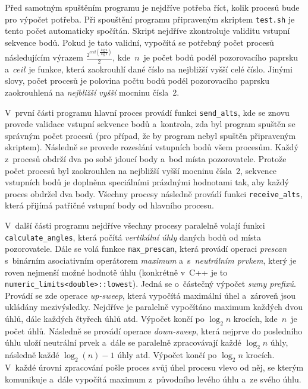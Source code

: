 \documentclass[a4paper, 10pt, twocolumn]{article}
\begin{document}
    Před samotným spuštěním programu je nejdříve potřeba říct, kolik
    procesů bude pro výpočet potřeba. Při spouštění programu připraveným
    skriptem \texttt{test.sh} je tento počet automaticky spočítán. Skript
    nejdříve zkontroluje validitu vstupní sekvence bodů. Pokud
    je tato validní, vypočítá se potřebný počet procesů následujícím
    výrazem $ \frac{2^{ceil(\frac{\log n}{\log 2})}}{2} $, kde~$ n $~je
    počet bodů podél pozorovacího paprsku a~$ ceil $ je funkce, která
    zaokrouhlí dané číslo na nejbližší vyšší celé číslo. Jinými slovy,
    počet procesů je polovina počtu bodů podél pozorovacího paprsku
    zaokrouhlená na \emph{nejbližší vyšší} mocninu čísla~2.

    V~první části programu hlavní proces provádí funkci
    \texttt{send\_alts}, kde se znovu provede validace vstupní sekvence
    bodů a~kontrola, zda byl program spuštěn se správným
    počet procesů (pro případ, že by program nebyl spuštěn připraveným
    skriptem). Následně se provede rozeslání vstupních bodů všem
    procesům. Každý z~procesů obdrží dva po sobě jdoucí body a~bod místa
    pozorovatele. Protože počet procesů byl zaokrouhlen na nejbližší
    vyšší mocninu čísla~2, sekvence vstupních bodů je doplněna speciálními
    prázdnými hodnotami tak, aby každý proces obdržel dva body. Všechny
    procesy následně provádí funkci \texttt{receive\_alts}, která přijímá
    patřičné vstupní body od hlavního procesu.

    V~další části programu nejdříve všechny procesy paralelně volají funkci
    \texttt{calculate\_angles}, která počítá \emph{vertikální úhly} daných
    bodů od místa pozorovatele. Dále se volá funkce \texttt{max\_prescan},
    která provádí operaci \emph{prescan} s~binárním asociativním operátorem
    \emph{maximum} a~s~\emph{neutrálním prvkem}, který je roven nejmenší
    možné hodnotě úhlu (konkrétně v~C++ je to
    \texttt{numeric\_limits<double>::lowest}). Jedná se o~částečný výpočet
    \emph{sumy prefixů}. Provádí se zde operace \emph{up-sweep},
    která vypočítá maximální úhel a~zároveň jsou ukládány mezivýsledky.
    Nejdříve je paralelně vypočítáno maximum každých dvou úhlů, dále
    každých čtyřech úhlů atd. Výpočet končí po $ \log_2 n $ krocích,
    kde~$ n $~je počet úhlů. Následně se provádí operace \emph{down-sweep},
    která nejprve do posledního úhlu uloží neutrální prvek a~dále se
    paralelně zpracovávají každé $ \log_2 n $ úhly, následně každé
    $ \log_2(n) - 1 $ úhly atd. Výpočet končí po $ \log_2 n $ krocích.
    V~každé úrovni zpracování pošle proces svůj úhel procesu vlevo od
    něj, se kterým komunikuje a~dále vypočítá maximum z~původního levého
    úhlu a~ze svého úhlu.
\end{document}
